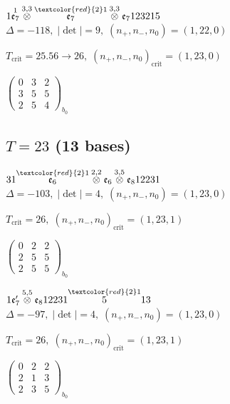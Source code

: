 \documentclass[10pt]{article}
\begin{document}
\smallskip

$1\overset{1}{\mathfrak{e}_7}\overset{3,3}{\otimes}\overset{\textcolor{red}{2}1}{\mathfrak{e}_7}\overset{3,3}{\otimes}\mathfrak{e}_7123215$ \quad $\Delta=-118,\; |\det|=9,\; (n_+,n_-,n_0)=(1,22,0)$

\hspace{1em}$T_{\text{crit}}=25.56 \to 26,\; (n_+,n_-,n_0)_{\text{crit}}=(1,23,0)$

\hspace{2em}$\left(\begin{smallmatrix}0 & 3 & 2 \\ 3 & 5 & 5 \\ 2 & 5 & 4\end{smallmatrix}\right)_{\!b_0}$


\subsection*{$T = 23$ \quad (13 bases)}
\smallskip

$31\overset{\textcolor{red}{2}1}{\mathfrak{e}_6}\overset{2,2}{\otimes}\mathfrak{e}_6\overset{3,5}{\otimes}\mathfrak{e}_812231$ \quad $\Delta=-103,\; |\det|=4,\; (n_+,n_-,n_0)=(1,23,0)$

\hspace{1em}$T_{\text{crit}}=26,\; (n_+,n_-,n_0)_{\text{crit}}=(1,23,1)$

\hspace{2em}$\left(\begin{smallmatrix}0 & 2 & 2 \\ 2 & 5 & 5 \\ 2 & 5 & 5\end{smallmatrix}\right)_{\!b_0}$

\smallskip

$1\mathfrak{e}_7'\overset{5,5}{\otimes}\mathfrak{e}_812231\overset{\textcolor{red}{2}1}{5}13$ \quad $\Delta=-97,\; |\det|=4,\; (n_+,n_-,n_0)=(1,23,0)$

\hspace{1em}$T_{\text{crit}}=26,\; (n_+,n_-,n_0)_{\text{crit}}=(1,23,1)$

\hspace{2em}$\left(\begin{smallmatrix}0 & 2 & 2 \\ 2 & 1 & 3 \\ 2 & 3 & 5\end{smallmatrix}\right)_{\!b_0}$
\end{document}
